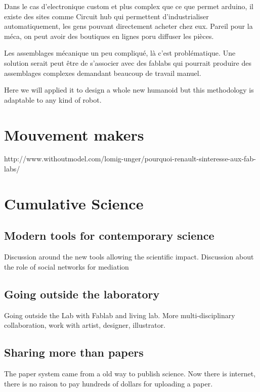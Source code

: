 Dans le cas d'electronique custom et plus complex que ce que permet arduino, il existe des sites comme Circuit hub qui permettent d'industrialiser automatiquement, les gens pouvant directement acheter chez eux. Pareil pour la méca, on peut avoir des boutiques en lignes poru diffuser les pièces.

Les assemblages mécanique un peu compliqué, là c'est problématique. Une solution serait peut être de s'associer avec des fablabs qui pourrait produire des assemblages complexes demandant beaucoup de travail manuel.



Here we will applied it to design a whole new humanoid but this methodology is adaptable to any kind of robot.

\section{Mouvement makers} %

http://www.withoutmodel.com/lomig-unger/pourquoi-renault-sinteresse-aux-fab-labs/

\section{Cumulative Science} %

\subsection{Modern tools for contemporary science} %

Discussion around the new tools allowing the scientific impact.
Discussion about the role of social networks for mediation

\subsection{Going outside the laboratory} %
Going outside the Lab with Fablab and living lab.
More multi-disciplinary collaboration, work with artist, designer, illustrator.


\subsection{Sharing more than papers} %

The paper system came from a old way to publish science. Now there is internet, there is no raison to pay hundreds of dollars for uploading a paper.

